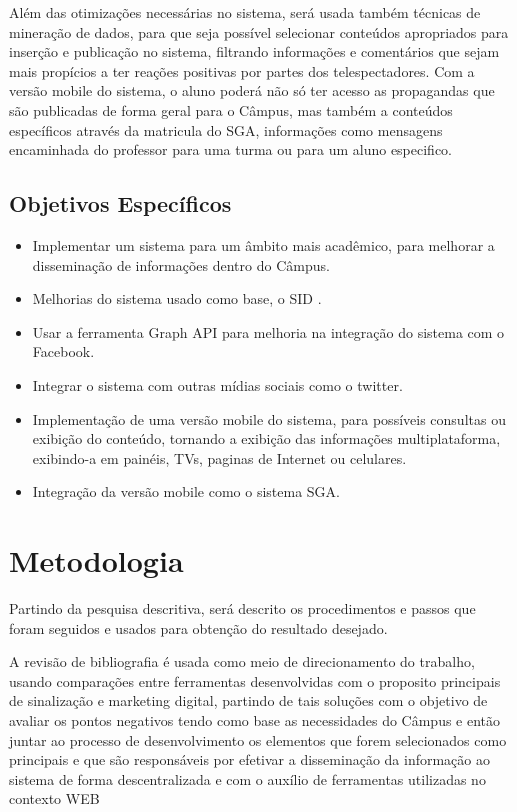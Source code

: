 \documentclass[
	12pt,				%
	openright,			%
	oneside,			%
	a4paper,			%
	english,			%
	french,				%
	spanish,			%
	brazil,				%
	]{abntex2}
\begin{document}
	 Além das otimizações necessárias no sistema, será usada também técnicas de mineração de dados, para que seja possível selecionar conteúdos apropriados para inserção e publicação no sistema, filtrando informações e comentários que sejam mais propícios a ter reações positivas por partes dos telespectadores. Com a versão mobile do sistema, o aluno poderá não só ter acesso as propagandas que são publicadas de forma geral para o Câmpus, mas também a conteúdos específicos através da matricula do SGA, informações como mensagens encaminhada do professor para uma turma ou para um aluno especifico.


\subsection*{Objetivos Específicos}
	 \begin{itemize}
	\item Implementar um sistema para um âmbito mais acadêmico, para melhorar a disseminação de informações dentro do Câmpus.
	 	
	\item Melhorias do sistema usado como base, o SID \cite{sobrinho2017}.
	
	\item Usar a ferramenta Graph API para melhoria na integração do sistema com o Facebook.
	
	\item Integrar o sistema com outras mídias sociais como o twitter.
	
	\item Implementação de uma versão mobile do sistema, para possíveis consultas ou exibição do conteúdo, tornando a exibição das informações multiplataforma, exibindo-a em painéis, TVs, paginas de Internet ou celulares.
	
	\item  Integração da versão mobile como o sistema SGA.
	\end{itemize}
\section*{Metodologia}
	Partindo da pesquisa descritiva, será descrito os procedimentos e passos que foram seguidos e usados para obtenção do resultado desejado.
	
	A revisão de bibliografia é usada como meio de direcionamento do trabalho, usando comparações entre ferramentas desenvolvidas com o proposito principais de sinalização e marketing digital, partindo de tais soluções com o objetivo de avaliar os pontos negativos tendo como base as necessidades do Câmpus e então juntar ao processo de desenvolvimento os elementos que forem selecionados como principais e que são responsáveis por efetivar a disseminação da informação ao sistema de forma descentralizada e com o auxílio de ferramentas utilizadas no contexto WEB
	 
\end{document}
